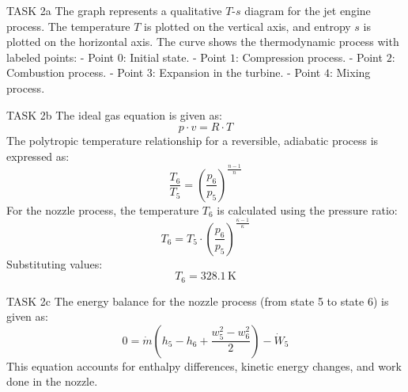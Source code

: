 TASK 2a  
The graph represents a qualitative \( T \)-\( s \) diagram for the jet engine process. The temperature \( T \) is plotted on the vertical axis, and entropy \( s \) is plotted on the horizontal axis. The curve shows the thermodynamic process with labeled points:  
- Point \( 0 \): Initial state.  
- Point \( 1 \): Compression process.  
- Point \( 2 \): Combustion process.  
- Point \( 3 \): Expansion in the turbine.  
- Point \( 4 \): Mixing process.  

TASK 2b  
The ideal gas equation is given as:  
\[
p \cdot v = R \cdot T
\]  
The polytropic temperature relationship for a reversible, adiabatic process is expressed as:  
\[
\frac{T_6}{T_5} = \left( \frac{p_6}{p_5} \right)^{\frac{n-1}{n}}
\]  
For the nozzle process, the temperature \( T_6 \) is calculated using the pressure ratio:  
\[
T_6 = T_5 \cdot \left( \frac{p_6}{p_5} \right)^{\frac{\kappa-1}{\kappa}}
\]  
Substituting values:  
\[
T_6 = 328.1 \, \text{K}
\]  

TASK 2c  
The energy balance for the nozzle process (from state 5 to state 6) is given as:  
\[
0 = \dot{m} \left( h_5 - h_6 + \frac{w_5^2 - w_6^2}{2} \right) - \dot{W}_5
\]  
This equation accounts for enthalpy differences, kinetic energy changes, and work done in the nozzle.